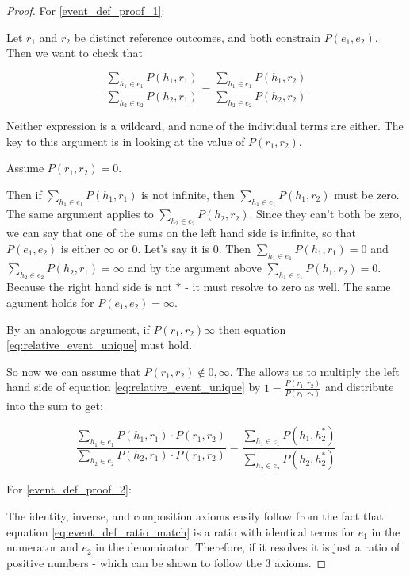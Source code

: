 \documentclass[twoside]{article}
\theoremstyle{plain}%
\theoremstyle{definition}
\theoremstyle{remark}
\begin{document}
\begin{proof}
For \ref{event_def_proof_1}:

Let \(r_1\) and \(r_2\) be distinct reference outcomes, and both constrain \(P(e_1, e_2)\). Then we want to check that

\begin{equation}
\label{eq:relative_event_unique}
\frac{\sum_{h_1 \in e_1} P(h_1, r_1)}{\sum_{h_2 \in e_2} P(h_2, r_1)} = \frac{\sum_{h_1 \in e_1} P(h_1, r_2)}{\sum_{h_2 \in e_2} P(h_2, r_2)}
\end{equation}

Neither expression is a wildcard, and none of the individual terms are either. The key to this argument is in looking at the value of \(P(r_1, r_2)\).

Assume \(P(r_1, r_2) = 0\). 

Then if \(\sum_{h_1 \in e_1} P(h_1, r_1)\) is not infinite, then \(\sum_{h_1 \in e_1} P(h_1, r_2)\) must be zero. The same argument applies to \(\sum_{h_2 \in e_2} P(h_2, r_2)\). Since they can't both be zero, we can say that one of the sums on the left hand side is infinite, so that \(P(e_1, e_2)\) is either \(\infty\) or 0. Let's say it is 0. Then \(\sum_{h_1 \in e_1} P(h_1, r_1) = 0\) and \(\sum_{h_2 \in e_2} P(h_2, r_1) = \infty\) and by the argument above \(\sum_{h_1 \in e_1} P(h_1, r_2) = 0\). Because the right hand side is not \(\ast\) - it must resolve to zero as well. The same agument holds for \(P(e_1, e_2) = \infty\).

By an analogous argument, if \(P(r_1, r_2) \infty\) then equation \ref{eq:relative_event_unique} must hold.

So now we can assume that \(P(r_1, r_2) \notin {0, \infty} \). The allows us to multiply the left hand side of equation \ref{eq:relative_event_unique} by \(1 = \frac{P(r_1, r_2)}{P(r_1, r_2)}\) and distribute into the sum to get:

\[\frac{\sum_{h_1 \in e_1} P(h_1, r_1) \cdot P(r_1, r_2)}{\sum_{h_2 \in e_2} P(h_2, r_1) \cdot P(r_1, r_2)} = \frac{\sum_{h_1 \in e_1} P(h_1, h_2^*)}{\sum_{h_2 \in e_2} P(h_2, h_2^*)}\]

For \ref{event_def_proof_2}:

The identity, inverse, and composition axioms easily follow from the fact that equation \ref{eq:event_def_ratio_match} is a ratio with identical terms for \(e_1\) in the numerator and \(e_2\) in the denominator. Therefore, if it resolves it is just a ratio of positive numbers - which can be shown to follow the 3 axioms.
\end{proof}
\end{document}
